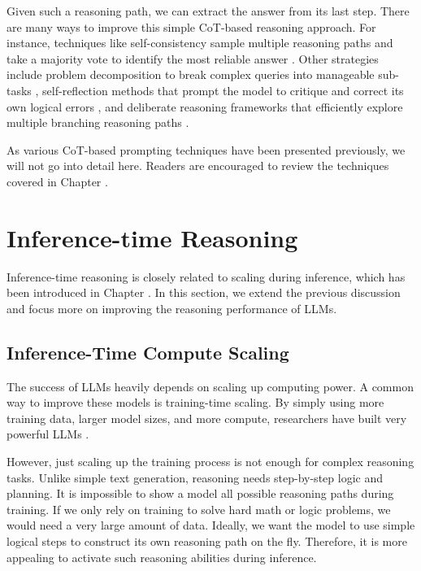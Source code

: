Given such a reasoning path, we can extract the answer from its last step. There are many ways to improve this simple CoT-based reasoning approach. For instance, techniques like self-consistency sample multiple reasoning paths and take a majority vote to identify the most reliable answer \cite{wang-etal:2023self}. Other strategies include problem decomposition to break complex queries into manageable sub-tasks \cite{zhou-etal:least}, self-reflection methods that prompt the model to critique and correct its own logical errors \cite{shinn-etal:2023reflexion,madaan-etal:2024self}, and deliberate reasoning frameworks that efficiently explore multiple branching reasoning paths \cite{yao-etal:2024tree}.


As various CoT-based prompting techniques have been presented previously, we will not go into detail here. Readers are encouraged to review the techniques covered in Chapter \ChapterLLMPrompting.



\section{Inference-time Reasoning}
\label{sec:inference-time-reasoning}

Inference-time reasoning is closely related to scaling during inference, which has been introduced in Chapter \ChapterLLMInference. In this section, we extend the previous discussion and focus more on improving the reasoning performance of LLMs.

\subsection{Inference-Time Compute Scaling}

The success of LLMs heavily depends on scaling up computing power. A common way to improve these models is training-time scaling. By simply using more training data, larger model sizes, and more compute, researchers have built very powerful LLMs \cite{kaplan-etal:2020scaling,hoffmann-etal:2022training}.

However, just scaling up the training process is not enough for complex reasoning tasks. Unlike simple text generation, reasoning needs step-by-step logic and planning. It is impossible to show a model all possible reasoning paths during training. If we only rely on training to solve hard math or logic problems, we would need a very large amount of data. Ideally, we want the model to use simple logical steps to construct its own reasoning path on the fly. Therefore, it is more appealing to activate  such reasoning abilities during inference.

